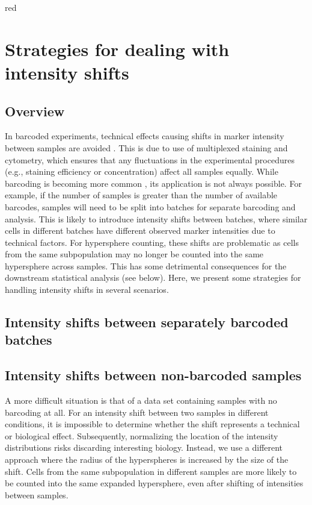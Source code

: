 \documentclass{article}
\begin{document}
\begin{color}{red}
\section{Strategies for dealing with intensity shifts}

\subsection{Overview}
In barcoded experiments, technical effects causing shifts in marker intensity between samples are avoided \cite{zunder2015palladium}.
This is due to use of multiplexed staining and cytometry, which ensures that any fluctuations in the experimental procedures (e.g., staining efficiency or concentration) affect all samples equally.
While barcoding is becoming more common \cite{gaudilliere2014delayed,gaudilliere2015implementing}, its application is not always possible.
For example, if the number of samples is greater than the number of available barcodes, samples will need to be split into batches for separate barcoding and analysis.
This is likely to introduce intensity shifts between batches, where similar cells in different batches have different observed marker intensities due to technical factors.
For hypersphere counting, these shifts are problematic as cells from the same subpopulation may no longer be counted into the same hypersphere across samples.
This has some detrimental consequences for the downstream statistical analysis (see below).
Here, we present some strategies for handling intensity shifts in several scenarios.

\subsection{Intensity shifts between separately barcoded batches}

\subsection{Intensity shifts between non-barcoded samples}
A more difficult situation is that of a data set containing samples with no barcoding at all.
For an intensity shift between two samples in different conditions, it is impossible to determine whether the shift represents a technical or biological effect.
Subsequently, normalizing the location of the intensity distributions risks discarding interesting biology.
Instead, we use a different approach where the radius of the hyperspheres is increased by the size of the shift.
Cells from the same subpopulation in different samples are more likely to be counted into the same expanded hypersphere, even after shifting of intensities between samples.


\end{color}
\end{document}
